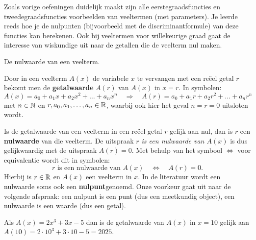 \documentclass{ximera}
\begin{document}
\begin{exercise}
                                                                                                                                                                                                                                                                                                                                                            
\end{exercise}
 
Zoals vorige oefeningen duidelijk maakt zijn alle eerstegraadsfuncties en tweedegraadsfuncties voorbeelden van veeltermen (met parameters). 
Je leerde reeds hoe je de nulpunten (bijvoorbeeld met de discriminantformule) van deze functies kan berekenen. 
Ook bij veeltermen voor willekeurige graad gaat de interesse van wiskundige uit naar de getallen die de veelterm nul maken. 


\begin{definition} De nulwaarde van een veelterm. 


    Door in een veelterm \(A(x)\) de variabele \(x\) te vervangen met een reëel getal \(r\) bekomt men de \textbf{getalwaarde} \(A(r)\) van \(A(x)\) in \(x = r\).  In symbolen:
    \[
    A(x) = a_0 + a_1x + a_2x^2 + \dots + a_n x^n \quad 
    \Rightarrow
    \quad A(r) = a_0 + a_1 r + a_2r^2 + \dots + a_n r^n
    \]
    met \(n \in \mathbb{N}\) en \(r, a_0, a_1, \ldots, a_n \in \mathbb{R}\), waarbij ook hier het geval \(n = r = 0\) uitsloten wordt. %
    
    Is de getalwaarde van een veelterm in een reëel getal \(r\) gelijk aan nul, dan is \(r\) een \textbf{nulwaarde} van die veelterm. De uitspraak \textit{ \(r\) is een nulwaarde van \(A(x)\)} is dus gelijkwaardig met de uitspraak \textit{ \(A(r) = 0\)}. Met behulp van het symbool \(\Leftrightarrow\) voor equivalentie wordt dit in symbolen:
    \[
    r \text{ is een nulwaarde van } A(x) \quad \Leftrightarrow \quad A(r) = 0.
    \]
    Hierbij is \(r \in \mathbb{R}\) en \(A(x)\) een veelterm in \(x\). In de literatuur wordt een nulwaarde soms ook een \textbf{nulpunt}genoemd. Onze voorkeur gaat uit naar de volgende afspraak: een nulpunt is een punt (dus een meetkundig object), een nulwaarde is een waarde (dus een getal).
    
\end{definition} 
    


\begin{example} 
    Als \(A(x) = 2x^3+3x-5\) dan is de getalwaarde van \(A(x)\) in \(x = 10\) gelijk aan \(A(10) = 2\cdot 10^3 + 3 \cdot 10 - 5 = 2025\).
\end{example} 
\end{document}
